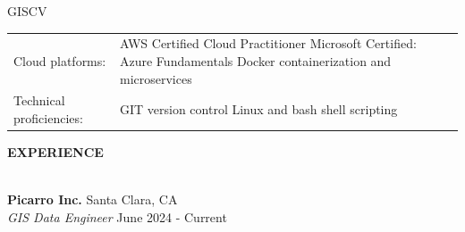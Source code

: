 \documentclass[letterpaper]{article}
\newcommand{\lineunder} {
        \vspace*{-8pt} \\
        \hspace*{-18pt} \hrulefill \\
    }
\newcommand{\header} [1] {
        \vspace{9pt}
        {\hspace*{-18pt}\vspace*{6pt} \large \textbf {#1}}
        \vspace*{-6pt} \lineunder
        \vspace{2pt}
    }
\newcommand{\employer}[4]{
        \vspace{3pt}
        \textbf{#1}  %
        \hfill #2\\  %
        \textit{#3}  %
        \hfill #4\\  %
        \vspace{3mm}
    }
\newenvironment{skillslist}
        {
            \hspace*{-0.07in}\begin{tabular}[t]{ l L{5.17in} }
        }{
            \end{tabular}
        }
\begin{document}
\begin{taggedblock}{GISCV}
\begin{skillslist}
            Cloud platforms:&
                AWS Certified Cloud Practitioner \linebreak
                Microsoft Certified: Azure Fundamentals \linebreak
                Docker containerization and microservices \linebreak
                \\
            Technical proficiencies:&
                GIT version control \linebreak
                Linux and bash shell scripting \linebreak
                \\
        \end{skillslist}
    \end{taggedblock}



\header{EXPERIENCE}



    \employer
        {Picarro Inc.}
        {Santa Clara, CA}
        {GIS Data Engineer}
        {June 2024 - Current}
\end{document}
